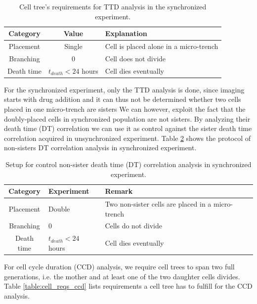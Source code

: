 \documentclass[pdftex,12pt,a4paper]{report}
\begin{document}
\begin{table}[H]
\centering
\begin{tabular}{ c | c | l }
\hline
Category & Value & Explanation \\
\hline\hline
Placement & Single & Cell is placed alone in a micro-trench \\
Branching & 0 & Cell does not divide \\
Death time & $t_{death} < 24$ hours  & Cell dies eventually\\
\hline
\end{tabular}
\caption[Cell tree's requirements for TTD analysis in the synchronized experiment]{Cell tree's requirements for TTD analysis in the synchronized experiment.}
\label{table:cell_reqs_syn}
\end{table}

For the synchronized experiment, only the TTD analysis is done, since imaging starts with drug addition and it can thus not be  determined whether two cells placed in one micro-trench are sisters We can however, exploit the fact that the doubly-placed cells in synchronized population are not sisters. By analyzing their death time (DT) correlation we can use it as control against the sister death time correlation acquired in unsynchronized experiment. Table \ref{table:dt_setup} shows the protocol of non-sisters DT correlation analysis in synchronized experiment.

\begin{table}[H]
\centering
\begin{tabular}{ c | l | l }
\hline
Category & Experiment & Remark \\
\hline\hline
Placement & Double & Two non-sister cells are placed in a micro-trench\\
Branching & 0 & Cells do not divide \\
Death time & $t_{death} < 24$ hours  & Cell dies eventually\\
\hline
\end{tabular}
\caption[Requirements for control non-sister death time (DT) correlation analysis]{Setup for control non-sister death time (DT) correlation analysis in synchronized experiment.}
\label{table:dt_setup}
\end{table}


For cell cycle duration (CCD) analysis, we require cell trees to span two full generations, i.e. the mother and at least one of the two daughter cells divides. Table \ref{table:cell_reqs_ccd} lists requirements a cell tree has to fulfill for the CCD analysis.
\end{document}
